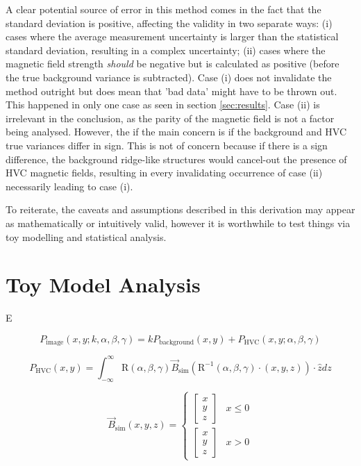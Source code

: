 A clear potential source of error in this method comes in the fact that the standard deviation is positive, affecting the validity in two separate ways: (i) cases where the average measurement uncertainty is larger than the statistical standard deviation, resulting in a complex uncertainty; (ii) cases where the magnetic field strength \textit{should} be negative but is calculated as positive (before the true background variance is subtracted). Case (i) does not invalidate the method outright but does mean that 'bad data' might have to be thrown out. This happened in only one case as seen in section \ref{sec:results}. Case (ii) is irrelevant in the conclusion, as the parity of the magnetic field is not a factor being analysed. However, the if the main concern is if the background and HVC true variances differ in sign. This is not of concern because if there is a sign difference, the background ridge-like structures would cancel-out the presence of HVC magnetic fields, resulting in every invalidating occurrence of case (ii) necessarily leading to case (i).


To reiterate, the caveats and assumptions described in this derivation may appear as mathematically or intuitively valid, however it is worthwhile to test things via toy modelling and statistical analysis.


\section{Toy Model Analysis}
\label{sec:toy_models}

E

\begin{equation}
    P_{\mathrm{image}} (x,y;k,\alpha,\beta,\gamma) = k P_{\mathrm{background}}(x,y) + P_{\mathrm{HVC}} (x,y;\alpha,\beta,\gamma)
    \label{eq:image_toy}
\end{equation}

\begin{equation}
    P_{\mathrm{HVC}} (x,y) = \int_{-\infty}^{\infty}{\mathrm{R}(\alpha,\beta,\gamma)\vec{B}_{\mathrm{sim}}(\mathrm{R}^{-1}(\alpha,\beta,\gamma)\cdot(x,y,z)) \cdot \hat{z}dz}
    \label{eq:toy_vec}
\end{equation}

\begin{equation}
    \vec{B}_{\mathrm{sim}}(x,y,z) =
    \begin{cases}
        \begin{bmatrix} x \\ y \\ z \end{bmatrix} & x\leq 0 \\
        \begin{bmatrix} x \\ y \\ z \end{bmatrix} & x > 0
    \end{cases}
    \label{eq:toy_mag}
\end{equation}

